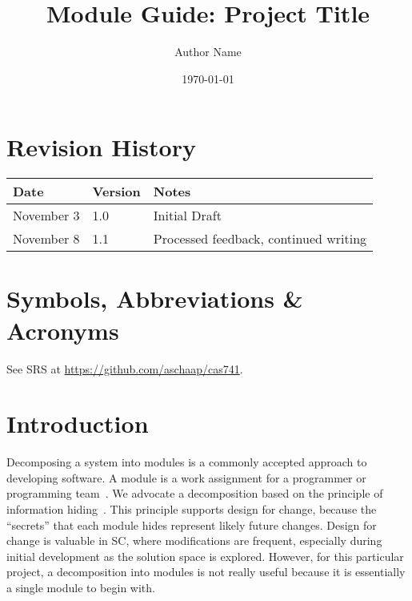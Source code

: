 \documentclass[12pt, titlepage]{article}
\begin{document}
\title{Module Guide: Project Title} 
\author{Author Name}
\date{\today}

\maketitle


\section{Revision History}

\begin{tabularx}{\textwidth}{p{3cm}p{2cm}X}
\toprule {\bf Date} & {\bf Version} & {\bf Notes}\\
\midrule
November 3 & 1.0 & Initial Draft\\
November 8 & 1.1 & Processed feedback, continued writing\\
\bottomrule
\end{tabularx}

\newpage

\section{Symbols, Abbreviations \& Acronyms}
See SRS at \url{https://github.com/aschaap/cas741}.

\newpage

\tableofcontents

%

\newpage


\section{Introduction}


Decomposing a system into modules is a commonly accepted approach to developing
software.  A module is a work assignment for a programmer or programming
team~\citep{ParnasEtAl1984}.  We advocate a decomposition
based on the principle of information hiding~\citep{Parnas1972a}.  This
principle supports design for change, because the ``secrets'' that each module
hides represent likely future changes.  Design for change is valuable in SC,
where modifications are frequent, especially during initial development as the
solution space is explored. However, for this particular project, a 
decomposition into modules is not really useful because it is essentially a 
single module to begin with.
\end{document}
